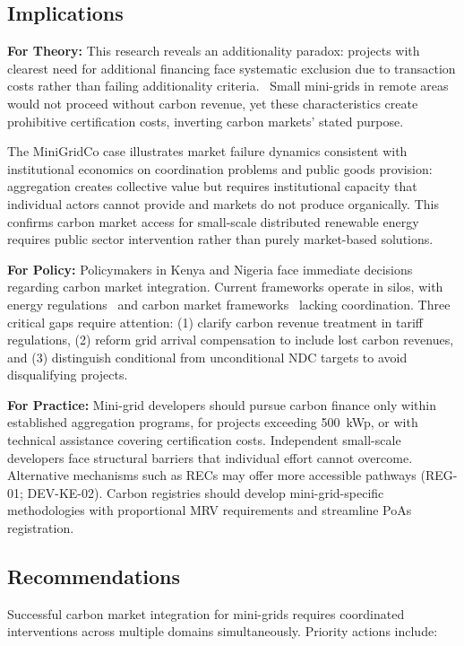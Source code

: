 \subsection{Implications}
\textbf{For Theory:} This research reveals an additionality paradox: projects with clearest need for additional financing face systematic exclusion due to transaction costs rather than failing additionality criteria.~\cite{michaelowa-evolution} Small mini-grids in remote areas would not proceed without carbon revenue, yet these characteristics create prohibitive certification costs, inverting carbon markets' stated purpose.

The MiniGridCo case illustrates market failure dynamics consistent with institutional economics on coordination problems and public goods provision: aggregation creates collective value but requires institutional capacity that individual actors cannot provide and markets do not produce organically. This confirms carbon market access for small-scale distributed renewable energy requires public sector intervention rather than purely market-based solutions.~\cite{michaelowa2005}

\textbf{For Policy:} Policymakers in Kenya and Nigeria face immediate decisions regarding carbon market integration. Current frameworks operate in silos, with energy regulations~\cite{epra-minigrid-regulations,nerc-minigrid-regulations} and carbon market frameworks~\cite{kenya-climate-change-regulations,ng-carbon-market-policy} lacking coordination. Three critical gaps require attention: (1) clarify carbon revenue treatment in tariff regulations, (2) reform grid arrival compensation to include lost carbon revenues, and (3) distinguish conditional from unconditional NDC targets to avoid disqualifying projects.~\cite{paris}

\textbf{For Practice:} Mini-grid developers should pursue carbon finance only within established aggregation programs, for projects exceeding 500~kWp, or with technical assistance covering certification costs. Independent small-scale developers face structural barriers that individual effort cannot overcome. Alternative mechanisms such as RECs may offer more accessible pathways (REG-01; DEV-KE-02). Carbon registries should develop mini-grid-specific methodologies with proportional MRV requirements and streamline PoAs registration.~\cite{goldStandardFees,verraFees,rrecs}

\subsection{Recommendations}
Successful carbon market integration for mini-grids requires coordinated interventions across multiple domains simultaneously. Priority actions include:

